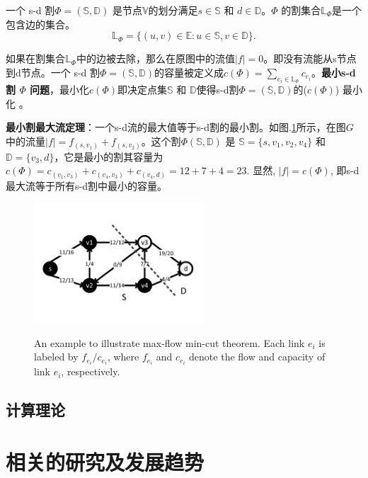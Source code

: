 一个 s-d 割${\Phi}=(\mathbb{S},\mathbb{D})$ 是节点$\mathbb{V}$的划分满足$s \in \mathbb{S}$ 和 $d \in \mathbb{D}$。$\Phi$ 的割集合$\mathbb{\mathbb{L}}_{\Phi}$是一个包含边的集合。
\begin{equation}
\mathbb{\mathbb{L}}_{\Phi}=\{(u,v)\in \mathbb{E}: u \in \mathbb{S}, v \in \mathbb{D}\}.
\end{equation}

如果在割集合$\mathbb{\mathbb{L}}_{\Phi}$中的边被去除，那么在原图中的流值$|f| = 0$。即没有流能从s节点到d节点。一个 s-d 割${\Phi}=(\mathbb{S},\mathbb{D})$的容量被定义成$c(\Phi)=\sum\limits_{e_i\in \mathbb{\mathbb{L}}_{\Phi}}c_{e_i}$。\textbf{最小s-d 割 $\Phi$ 问题}，最小化$c(\Phi)$即决定点集$\mathbb{S}$ 和 $\mathbb{D}$使得s-d割${\Phi}=(\mathbb{S},\mathbb{D})$的($c(\Phi)$) 最小化 。

\textbf{最小割最大流定理}：一个s-d流的最大值等于s-d割的最小割。如图.\ref{fig:FlowNetwork}所示，在图$G$中的流量$|f|=f_{(s,v_1)}+f_{(s,v_2)}$。这个割$\Phi(\mathbb{S},\mathbb{D})$ 是 $\mathbb{S}=\{s,v_1,v_2,v_4\}$ 和$\mathbb{D}=\{v_3,d\}$，它是最小的割其容量为$c(\Phi)=c_{(v_1,v_3)}+c_{(v_4,v_3)}+c_{(v_4,d)}=12+7+4=23$. 显然, $|f|=c(\Phi)$, 即s-d 最大流等于所有s-d割中最小的容量。
\begin{figure}[htbp]
  \centering
  \includegraphics[width=2.5in]{figures/FlowNetwork}\\
  \caption{An example to illustrate max-flow min-cut theorem. Each link $e_i$ is labeled by $f_{e_i}/c_{e_i}$, where $f_{e_i}$ and $c_{e_i}$ denote the flow and capacity of link $e_i$, respectively.   }
  \label{fig:FlowNetwork}
\end{figure}

\subsection{计算理论}

\section{相关的研究及发展趋势}


